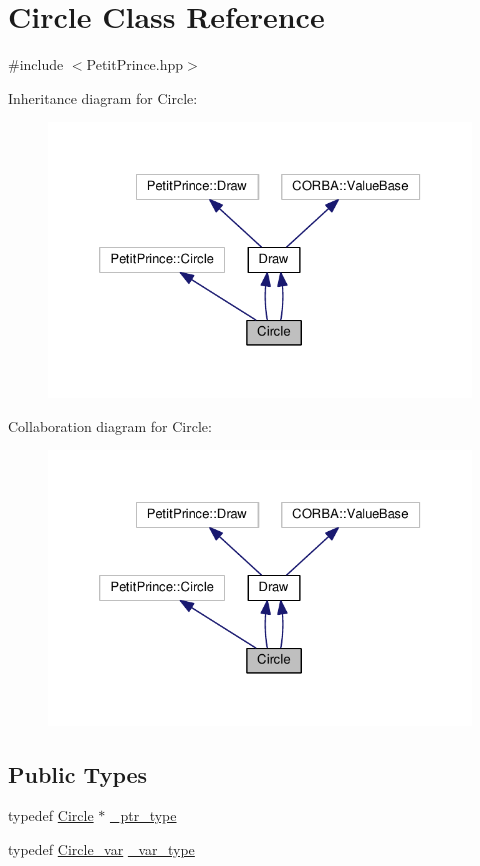\hypertarget{class_circle}{}\section{Circle Class Reference}
\label{class_circle}


{\ttfamily \#include $<$Petit\+Prince.\+hpp$>$}



Inheritance diagram for Circle\+:
\nopagebreak
\begin{figure}[H]
\begin{center}
\leavevmode
\includegraphics[width=326pt]{class_circle__inherit__graph}
\end{center}
\end{figure}


Collaboration diagram for Circle\+:
\nopagebreak
\begin{figure}[H]
\begin{center}
\leavevmode
\includegraphics[width=326pt]{class_circle__coll__graph}
\end{center}
\end{figure}
\subsection*{Public Types}
\begin{DoxyCompactItemize}
\item 
typedef \hyperlink{class_circle}{Circle} $\ast$ \hyperlink{class_circle_ae284325f0ac7647d6e137e8a3f507f38}{\+\_\+ptr\+\_\+type}
\item 
typedef \hyperlink{_petit_prince_8hpp_ac2106cf1632c65be064ea3929f62047b}{Circle\+\_\+var} \hyperlink{class_circle_a193392939eca82b9195367ac5be1461a}{\+\_\+var\+\_\+type}
\end{DoxyCompactItemize}
